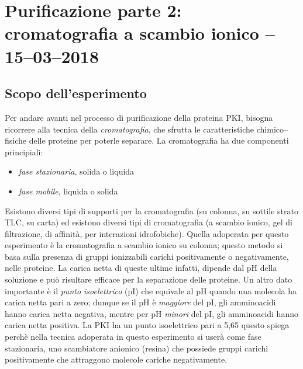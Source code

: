 \documentclass[twocolumn,a4paper,10pt]{my_report}
\begin{document}
{\section{Purificazione parte 2: cromatografia a scambio ionico -- 15--03--2018}
\subsection{Scopo dell'esperimento}
Per andare avanti nel processo di purificazione della proteina PKI, bisogna ricorrere alla tecnica della \emph{cromatografia}, che sfrutta le caratteristiche chimico--fisiche delle proteine per poterle separare. La cromatografia ha due componenti principiali:
\begin{itemize}
  \item \emph{fase stazionaria}, solida o liquida
  \item \emph{fase mobile}, liquida o solida
\end{itemize}

Esistono diversi tipi di supporti per la cromatografia (su colonna, su sottile strato TLC, su carta) ed esistono diversi tipi di cromatografia (a scambio ionico, gel di filtrazione, di affinità, per interazioni idrofobiche).
Quella adoperata per questo esperimento è la cromatografia a scambio ionico su colonna; questo metodo si basa sulla presenza di gruppi ionizzabili carichi positivamente o negativamente, nelle proteine. La carica netta di queste ultime infatti, dipende dal pH della soluzione e può risultare efficace per la separazione delle proteine.
Un altro dato importante è il \emph{punto isoelettrico} (pI) che equivale al pH quando una molecola ha carica netta pari a zero;
dunque se il pH è \emph{maggiore} del pI, gli amminoacidi hanno carica netta negativa, mentre per pH \emph{minori} del pI, gli amminoacidi hanno carica netta positiva.
La PKI ha un punto isoelettrico pari a 5,65 questo spiega perchè nella tecnica adoperata in questo esperimento si userà come fase stazionaria, uno scambiatore anionico (resina) che possiede gruppi carichi positivamente che attraggono molecole cariche negativamente.

}
\end{document}

